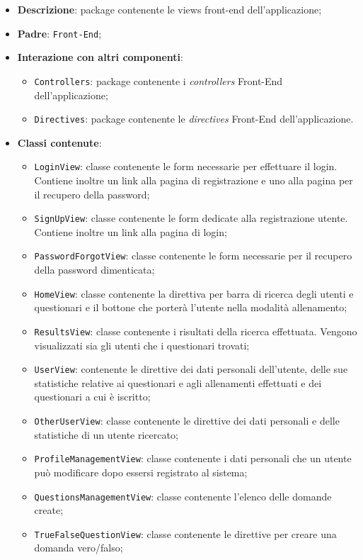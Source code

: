 \begin{itemize}
	\item \textbf{Descrizione}: package contenente le views front-end dell'applicazione;
	\item \textbf{Padre}: \texttt{Front-End};
	\item \textbf{Interazione con altri componenti}:
	\begin{itemize}
		\item \texttt{Controllers}: package contenente i \textit{controllers} Front-End dell'applicazione;
		\item \texttt{Directives}: package contenente le \textit{directives} Front-End dell'applicazione.
	\end{itemize}
	\item \textbf{Classi contenute}:
	\begin{itemize}
		\item \texttt{LoginView}: classe contenente le form necessarie per effettuare il login. Contiene inoltre un link alla pagina di registrazione e uno alla pagina per il recupero della password;
		\item \texttt{SignUpView}: classe contenente le form dedicate alla registrazione utente. Contiene inoltre un link alla pagina di login;
		\item \texttt{PasswordForgotView}: classe contenente le form necessarie per il recupero della password dimenticata;
		\item \texttt{HomeView}: classe contenente la direttiva per barra di ricerca degli utenti e questionari e il bottone che porterà l'utente nella modalità allenamento;
		\item \texttt{ResultsView}: classe contenente i risultati della ricerca effettuata. Vengono visualizzati sia gli utenti che i questionari trovati;
		\item \texttt{UserView}: contenente le direttive dei dati personali dell'utente, delle sue statistiche relative ai questionari e agli allenamenti effettuati e dei questionari a cui è iscritto;
		\item \texttt{OtherUserView}: classe contenente le direttive dei dati personali e delle statistiche di un utente ricercato;
		\item \texttt{ProfileManagementView}: classe contenente i dati personali che un utente può modificare dopo essersi registrato al sistema;
		\item \texttt{QuestionsManagementView}: classe contenente l'elenco delle domande create;
		\item \texttt{TrueFalseQuestionView}: classe contenente le direttive per creare una domanda vero/falso;

\end{itemize}
\end{itemize}
